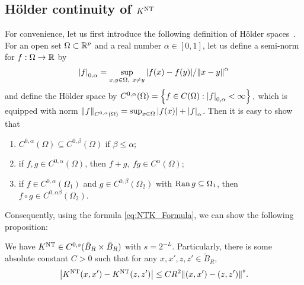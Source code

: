 \subsection{Hölder continuity of \texorpdfstring{$K^{\mathrm{NT}}$}{NTK}}\label{subsec:Holder_NTK}
For convenience, let us first introduce the following definition of Hölder spaces~\citep{adams2003_SobolevSpaces}.
For an open set $\Omega \subset \mathbb{R}^p$ and a real number $\alpha \in [0,1]$, let us define a semi-norm for $f : \Omega \to \mathbb{R}$ by
\begin{align*}
  \abs{f}_{0,\alpha} = \sup_{x,y \in \Omega,~x\neq y}{\abs{f(x) - f(y)}}/{\norm{x-y}^\alpha}
\end{align*}
and define the Hölder space by $C^{0,\alpha}(\Omega) = \left\{ f \in C(\Omega) : \abs{f}_{0,\alpha} < \infty \right\},$
which is equipped with norm $\norm{f}_{C^{0,\alpha}(\Omega)} = \sup_{x \in \Omega} \abs{f(x)} + \abs{f}_{\alpha}$.
Then it is easy to show that
\begin{enumerate}[$(a)$~]
  \item $C^{0,\alpha}(\Omega) \subseteq C^{0,\beta}(\Omega)$ if $\beta \leq \alpha$;
  \item if $f,g \in C^{0,\alpha}(\Omega)$, then $f + g,~ fg \in C^{\alpha}(\Omega)$;
  \item if $f \in C^{0,\alpha}(\Omega_1)$ and $g \in C^{0,\beta}(\Omega_2)$ with $\operatorname{Ran} g \subseteq \Omega_1$, then $f\circ g \in C^{0,\alpha\beta}(\Omega_2)$.
\end{enumerate}
Consequently, using the formula \cref{eq:NTK_Formula}, we can show the following proposition:
\begin{proposition}
  \label{prop:NTK_Continuity}
  We have $K^{\mathrm{NT}} \in C^{0,s}( \tilde{B}_R \times  \tilde{B}_R)$ with $s = 2^{-L}$.
  Particularly, there is some absolute constant $C>0$ such that
  for any $x,x',z,z' \in  \tilde{B}_R$,
  \begin{align}
    \abs{K^{\mathrm{NT}}(x,x') - K^{\mathrm{NT}}(z,z')} \leq C R^2 \norm{(x,x') - (z,z')}^s.
  \end{align}
\end{proposition}
